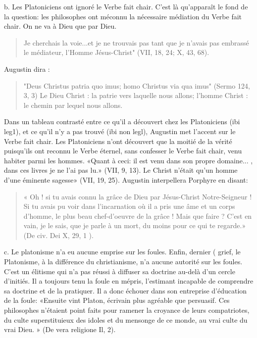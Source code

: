 b.	Les Platoniciens ont ignoré le Verbe fait chair. C'est là qu'apparaît le fond de la question: les philosophes ont méconnu la nécessaire médiation du Verbe fait chair. On ne va à Dieu que par Dieu. 
\begin{quote}
    Je cherchais la voie...et je ne trouvais pas tant
que je n'avais pas embrassé le médiateur, l'Homme Jésus-Christ" (VII, 18, 24; X,
43, 68).
\end{quote} 
Augustin dira : 
\begin{quote}
    "Deus Christus patria quo imus; homo Christus via qua imus" (Sermo 124, 3, 3) Le Dieu Christ : la patrie vers laquelle nous allons; l'homme Christ : le chemin par lequel nous allons.
\end{quote}
 Dans un tableau contrasté entre ce qu'il a découvert chez les Platoniciens (ibi leg1), et ce qu'il n'y a pas trouvé (ibi non legl), Augustin met l'accent sur le Verbe fait chair. Les Platoniciens n'ont découvert que la moitié de la vérité puisqu'ils ont reconnu le Verbe éternel, sans confesser le Verbe fait chair, venu habiter parmi les hommes. «Quant à ceci: il est venu dans son propre domaine... , dans ces livres je ne l'ai pas lu.» (VII, 9, 13). Le Christ n'était qu'un homme d'une éminente sagesse» (VII, 19, 25). Augustin interpellera Porphyre en disant:
\begin{quote}
    « Oh ! si tu avais connu la grâce de Dieu par Jésus-Christ Notre-Seigneur ! Si tu avais pu voir dans l'incarnation où il a pris une âme et un corps d'homme, le plus beau chef-d'oeuvre de la grâce ! Mais que faire ? C'est en vain, je le sais, que je parle à un mort, du moins pour ce qui te regarde.» (De civ. Dei X, 29, 1 ).
\end{quote}


c.	Le platonisme n'a eu aucune  emprise sur les foules. Enfin, dernier	(
grief, le Platonisme, à la différence du christianisme,	n'a aucune autorité sur les
foules. C'est un élitisme qui n'a pas réussi à diffuser sa doctrine au-delà d'un cercle d'initiés. Il a toujours tenu la foule en mépris, l'estimant incapable de comprendre sa doctrine et de la pratiquer. Il a donc échouer dans son entreprise d'éducation de la foule: «Ensuite vint Platon, écrivain plus agréable que persuasif. Ces philosophes n'étaient point faits pour ramener la croyance de leurs compatriotes, du culte superstituieux des idoles et du mensonge de ce monde, au vrai culte du vrai Dieu. » (De vera religione Il, 2).


